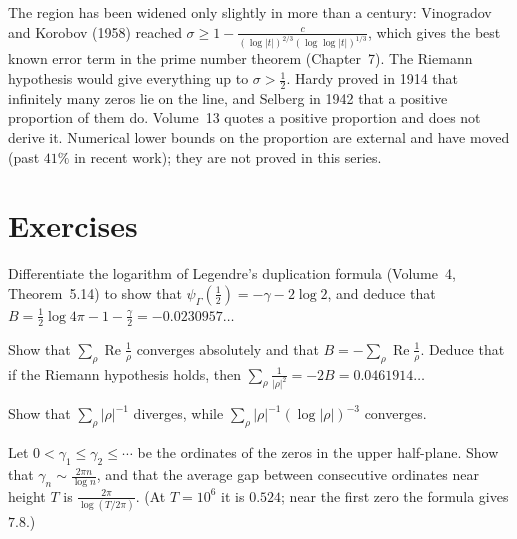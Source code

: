 \begin{remark}
The region has been widened only slightly in more than a century: Vinogradov and Korobov (1958) reached $\sigma\ge1-\frac c{(\log|t|)^{2/3}(\log\log|t|)^{1/3}}$, which gives the best known error term in the
prime number theorem (Chapter~7). The Riemann hypothesis would give everything up to $\sigma>\frac12$. Hardy proved in 1914 that infinitely many zeros lie on the line, and Selberg in 1942 that
a positive proportion of them do. Volume~13 quotes a positive proportion and does not derive it. Numerical lower bounds on the proportion are external and have moved (past $41\%$ in recent work); they are not proved in this series.
\end{remark}

\section{Exercises}

\begin{exercise}[$\star$]\label{ex:digammahalf}
Differentiate the logarithm of Legendre's duplication formula (Volume~4, Theorem~5.14) to show that $\psi_\Gamma(\frac12)=-\gamma-2\log2$, and deduce that $B=\frac12\log4\pi-1-\frac\gamma2=-0.0230957\ldots$
\end{exercise}

\begin{exercise}[$\star\star$]\label{ex:bsum}
Show that $\sum_\rho\operatorname{Re}\frac1\rho$ converges absolutely and that $B=-\sum_\rho\operatorname{Re}\frac1\rho$. Deduce that if the Riemann hypothesis holds, then $\sum_\rho\frac1{|\rho|^2}=-2B=0.0461914\ldots$
\end{exercise}

\begin{exercise}[$\star$]\label{ex:zerosums}
Show that $\sum_\rho|\rho|^{-1}$ diverges, while $\sum_\rho|\rho|^{-1}(\log|\rho|)^{-3}$ converges.
\end{exercise}

\begin{exercise}\label{ex:nthzero}
Let $0<\gamma_1\le\gamma_2\le\cdots$ be the ordinates of the zeros in the upper half-plane. Show that $\gamma_n\sim\frac{2\pi n}{\log n}$, and that the average gap between consecutive ordinates near
height $T$ is $\frac{2\pi}{\log(T/2\pi)}$. (At $T=10^6$ it is $0.524$; near the first zero the formula gives $7.8$.)
\end{exercise}

